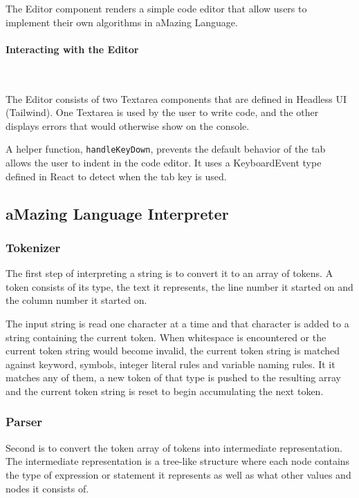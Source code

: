 The Editor component renders a simple code editor that allow users to implement their own algorithms in aMazing Language.

\paragraph{Interacting with the Editor} \

The Editor consists of two Textarea components that are defined in Headless UI (Tailwind). One Textarea is used by the user to write code, and the other displays errors that would otherwise show on the console.

A helper function, \texttt{handleKeyDown}, prevents the default behavior of the tab allows the user to indent in the code editor. It uses a KeyboardEvent type defined in React to detect when the tab key is used.

\subsection{aMazing Language Interpreter}

\subsubsection{Tokenizer}

The first step of interpreting a string is to convert it to an array of tokens. A token consists of its type, the text it represents, the line number it started on and the column number it started on.

The input string is read one character at a time and that character is added to a string containing the current token. When whitespace is encountered or the current token string would become invalid, the current token string is matched against keyword, symbols, integer literal rules and variable naming rules. It it matches any of them, a new token of that type is pushed to the resulting array and the current token string is reset to begin accumulating the next token.

\subsubsection{Parser}

Second is to convert the token array of tokens into intermediate representation. The intermediate representation is a tree-like structure where each node contains the type of expression or statement it represents as well as what other values and nodes it consists of.

